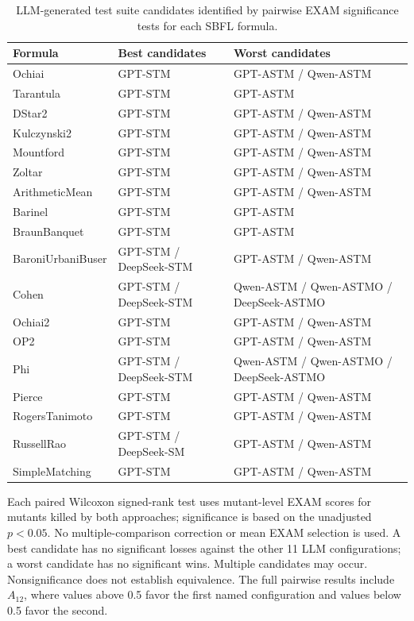 \begin{table}[t]
\centering
\caption{LLM-generated test suite candidates identified by pairwise EXAM significance tests for each SBFL formula.}
\label{tab:rq3bw-selection}
\begin{tabular}{lll}
\hline
Formula & Best candidates & Worst candidates \\
\hline
Ochiai & GPT-STM & GPT-ASTM / Qwen-ASTM \\
Tarantula & GPT-STM & GPT-ASTM \\
DStar2 & GPT-STM & GPT-ASTM / Qwen-ASTM \\
Kulczynski2 & GPT-STM & GPT-ASTM / Qwen-ASTM \\
Mountford & GPT-STM & GPT-ASTM / Qwen-ASTM \\
Zoltar & GPT-STM & GPT-ASTM / Qwen-ASTM \\
ArithmeticMean & GPT-STM & GPT-ASTM / Qwen-ASTM \\
Barinel & GPT-STM & GPT-ASTM \\
BraunBanquet & GPT-STM & GPT-ASTM \\
BaroniUrbaniBuser & GPT-STM / DeepSeek-STM & GPT-ASTM / Qwen-ASTM \\
Cohen & GPT-STM / DeepSeek-STM & Qwen-ASTM / Qwen-ASTMO / DeepSeek-ASTMO \\
Ochiai2 & GPT-STM & GPT-ASTM / Qwen-ASTM \\
OP2 & GPT-STM & GPT-ASTM / Qwen-ASTM \\
Phi & GPT-STM / DeepSeek-STM & Qwen-ASTM / Qwen-ASTMO / DeepSeek-ASTMO \\
Pierce & GPT-STM & GPT-ASTM / Qwen-ASTM \\
RogersTanimoto & GPT-STM & GPT-ASTM / Qwen-ASTM \\
RussellRao & GPT-STM / DeepSeek-SM & GPT-ASTM / Qwen-ASTM \\
SimpleMatching & GPT-STM & GPT-ASTM / Qwen-ASTM \\
\hline
\end{tabular}
\par\smallskip
\begin{minipage}{\linewidth}\footnotesize Each paired Wilcoxon signed-rank test uses mutant-level EXAM scores for mutants killed by both approaches; significance is based on the unadjusted $p<0.05$. No multiple-comparison correction or mean EXAM selection is used. A best candidate has no significant losses against the other 11 LLM configurations; a worst candidate has no significant wins. Multiple candidates may occur. Nonsignificance does not establish equivalence. The full pairwise results include $A_{12}$, where values above 0.5 favor the first named configuration and values below 0.5 favor the second.
\end{minipage}
\end{table}
